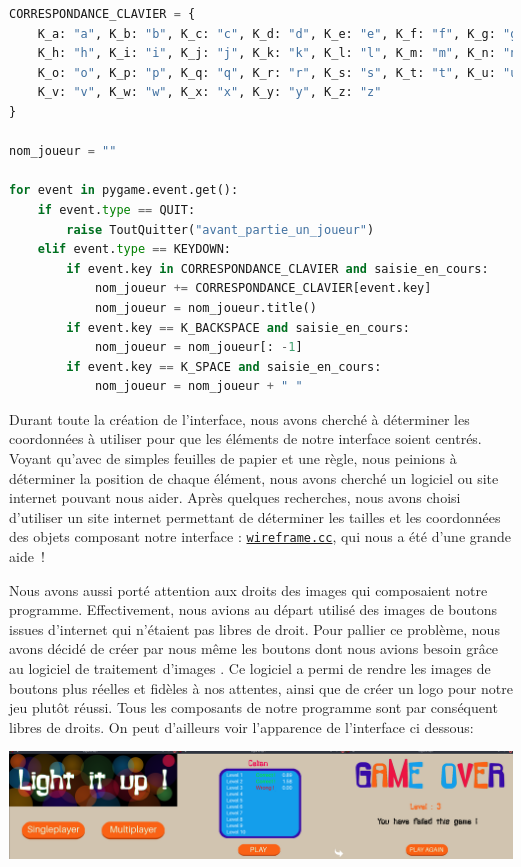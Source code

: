 \documentclass[a4paper, 11pt]{article}
\newcommand{\gimp}{\sf{GIMP}}
\begin{document}
\begin{lstlisting}[language=Python, float=H, caption=Saisie du nom du joueur]
CORRESPONDANCE_CLAVIER = {
    K_a: "a", K_b: "b", K_c: "c", K_d: "d", K_e: "e", K_f: "f", K_g: "g",
    K_h: "h", K_i: "i", K_j: "j", K_k: "k", K_l: "l", K_m: "m", K_n: "n",
    K_o: "o", K_p: "p", K_q: "q", K_r: "r", K_s: "s", K_t: "t", K_u: "u",
    K_v: "v", K_w: "w", K_x: "x", K_y: "y", K_z: "z"
}

nom_joueur = ""

for event in pygame.event.get():
    if event.type == QUIT:
        raise ToutQuitter("avant_partie_un_joueur")
    elif event.type == KEYDOWN:
        if event.key in CORRESPONDANCE_CLAVIER and saisie_en_cours:
            nom_joueur += CORRESPONDANCE_CLAVIER[event.key]
            nom_joueur = nom_joueur.title()
        if event.key == K_BACKSPACE and saisie_en_cours:
            nom_joueur = nom_joueur[: -1]
        if event.key == K_SPACE and saisie_en_cours:
            nom_joueur = nom_joueur + " "
\end{lstlisting}

Durant toute la création de l'interface, nous avons cherché à déterminer les coordonnées à utiliser pour que les éléments de notre interface soient centrés. Voyant qu'avec de simples feuilles de papier et une règle, nous peinions à déterminer la position de chaque élément, nous avons cherché un logiciel ou site internet pouvant nous aider. Après quelques recherches, nous avons choisi d'utiliser un site internet permettant de déterminer les tailles et les coordonnées des objets composant notre interface : \href{https://wireframe.cc/}{\tt{wireframe.cc}}, qui nous a été d'une grande aide~!

Nous avons aussi porté attention aux droits des images qui composaient notre programme. Effectivement, nous avions au départ utilisé des images de boutons issues d'internet qui n'étaient pas libres de droit. Pour pallier ce problème, nous avons décidé de créer par nous même les boutons dont nous avions besoin grâce au logiciel de traitement d'images \gimp{}. Ce logiciel a permi de rendre les images de boutons plus réelles et fidèles à nos attentes, ainsi que de créer un logo pour notre jeu plutôt réussi. Tous les composants de notre programme sont par conséquent libres de droits. On peut d'ailleurs voir l'apparence de l'interface ci dessous:

\begin{center}
\includegraphics[width = 17cm]{interface.png}
\end{center}
\end{document}
